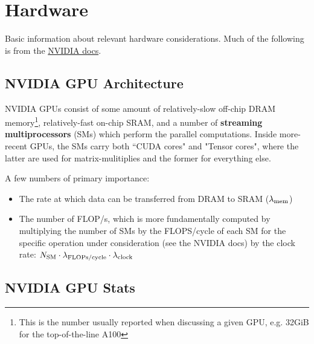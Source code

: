 \documentclass[11pt]{article}
\begin{document}
\section{Hardware}

Basic information about relevant hardware considerations. Much of the following is from the
\href{https://docs.nvidia.com/deeplearning/performance/dl-performance-gpu-background/index.html}{NVIDIA
docs}.



\subsection{NVIDIA GPU Architecture}

NVIDIA GPUs consist of some amount of relatively-slow off-chip DRAM memory\footnote{This is the number usually reported when
discussing a given GPU, e.g. 32GiB for the top-of-the-line A100}, relatively-fast on-chip SRAM, and
a number of \textbf{streaming multiprocessors} (SMs) which perform the parallel computations.  Inside
more-recent GPUs, the SMs carry both ``CUDA cores" and "Tensor cores", where the latter are used for matrix-mulitiplies
and the former for everything else.


A few numbers of primary importance:
\begin{itemize}
    \item The rate at which data can be transferred from DRAM to SRAM ($ \lambda _{ {\rm mem} } $)
    \item The number of FLOP/s, which is more fundamentally computed by multiplying the number of
    SMs by the FLOPS/cycle of each SM for the specific operation under consideration (see the NVIDIA
    docs) by the clock rate: $ N _{ {\rm SM} }\cdot  \lambda _{ {\rm FLOPs/cycle} }\cdot  \lambda _{
    {\rm clock} } $
\end{itemize}


\subsection{NVIDIA GPU Stats \label{app_gpu_stats}}
\end{document}
